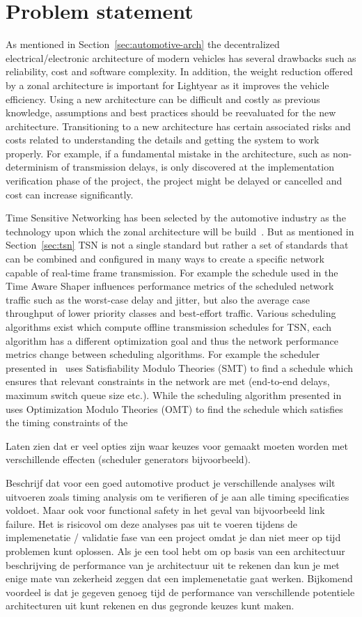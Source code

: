 \section{Problem statement}
As mentioned in Section~\ref{sec:automotive-arch} the decentralized electrical/electronic architecture of modern vehicles has several drawbacks such as reliability, cost and software complexity. In addition, the weight reduction offered by a zonal architecture is important for Lightyear as it improves the vehicle efficiency. Using a new architecture can be difficult and costly as previous knowledge, assumptions and best practices should be reevaluated for the new architecture. Transitioning to a new architecture has certain associated risks and costs related to understanding the details and getting the system to work properly. For example, if a fundamental mistake in the architecture, such as non-determinism of transmission delays, is only discovered at the implementation verification phase of the project, the project might be delayed or cancelled and cost can increase significantly.

Time Sensitive Networking has been selected by the automotive industry as the technology upon which the zonal architecture will be build~\cite{klaus2019zonal}. But as mentioned in Section~\ref{sec:tsn} TSN is not a single standard but rather a set of standards that can be combined and configured in many ways to create a specific network capable of real-time frame transmission. For example the schedule used in the Time Aware Shaper influences performance metrics of the scheduled network traffic such as the worst-case delay and jitter, but also the average case throughput of lower priority classes and best-effort traffic. Various scheduling algorithms exist which compute offline transmission schedules for TSN, each algorithm has a different optimization goal and thus the network performance metrics change between scheduling algorithms. For example the scheduler presented in~ uses Satisfiability Modulo Theories (SMT) to find a schedule which ensures that relevant constraints in the network are met (end-to-end delays, maximum switch queue size etc.). While the scheduling algorithm presented in~\cite{houtan2021synthesising} uses Optimization Modulo Theories (OMT) to find the schedule which satisfies the timing constraints of the 


Laten zien dat er veel opties zijn waar keuzes voor gemaakt moeten worden met verschillende effecten (scheduler generators bijvoorbeeld).

Beschrijf dat voor een goed automotive product je verschillende analyses wilt uitvoeren zoals timing analysis om te verifieren of je aan alle timing specificaties voldoet. Maar ook voor functional safety in het geval van bijvoorbeeld link failure. Het is risicovol om deze analyses pas uit te voeren tijdens de implemenetatie / validatie fase van een project omdat je dan niet meer op tijd problemen kunt oplossen. Als je een tool hebt om op basis van een architectuur beschrijving de performance van je architectuur uit te rekenen dan kun je met enige mate van zekerheid zeggen dat een implemenetatie gaat werken. Bijkomend voordeel is dat je gegeven genoeg tijd de performance van verschillende potentiele architecturen uit kunt rekenen en dus gegronde keuzes kunt maken.
